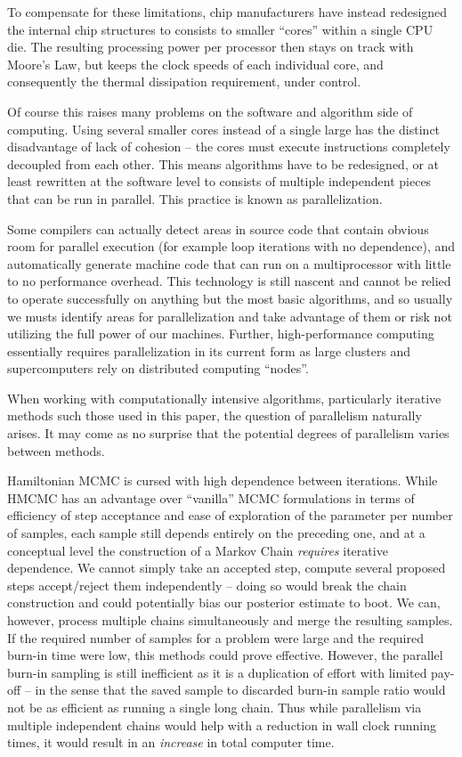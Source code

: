 	To compensate for these limitations, chip manufacturers have instead redesigned the internal chip structures to consists to smaller ``cores'' within a single CPU die. The resulting processing power per processor then stays on track with Moore's Law, but keeps the clock speeds of each individual core, and consequently the thermal dissipation requirement, under control.

	Of course this raises many problems on the software and algorithm side of computing. Using several smaller cores instead of a single large has the distinct disadvantage of lack of cohesion -- the cores must execute instructions completely decoupled from each other. This means algorithms have to be redesigned, or at least rewritten at the software level to consists of multiple independent pieces that can be run in parallel. This practice is known as parallelization.

	Some compilers can actually detect areas in source code that contain obvious room for parallel execution (for example loop iterations with no dependence), and automatically generate machine code that can run on a multiprocessor with little to no performance overhead. This technology is still nascent and cannot be relied to operate successfully on anything but the most basic algorithms, and so usually we musts identify areas for parallelization and take advantage of them or risk not utilizing the full power of our machines. Further, high-performance computing essentially requires parallelization in its current form as large clusters and supercomputers rely on distributed computing ``nodes''.

	When working with computationally intensive algorithms, particularly iterative methods such those used in this paper, the question of parallelism naturally arises. It may come as no surprise that the potential degrees of parallelism varies between methods.

	Hamiltonian MCMC is cursed with high dependence between iterations. While HMCMC has an advantage over ``vanilla'' MCMC formulations in terms of efficiency of step acceptance and ease of exploration of the parameter per number of samples, each sample still depends entirely on the preceding one, and at a conceptual level the construction of a Markov Chain \textit{requires} iterative dependence. We cannot simply take an accepted step, compute several proposed steps accept/reject them independently -- doing so would break the chain construction and could potentially bias our posterior estimate to boot. We can, however, process multiple chains simultaneously and merge the resulting samples. If the required number of samples for a problem were large and the required burn-in time were low, this methods could prove effective. However, the parallel burn-in sampling is still inefficient as it is a duplication of effort with limited pay-off -- in the sense that the saved sample to discarded burn-in sample ratio would not be as efficient as running a single long chain. Thus while parallelism via multiple independent chains would help with a reduction in wall clock running times, it would result in an \textit{increase} in total computer time.


